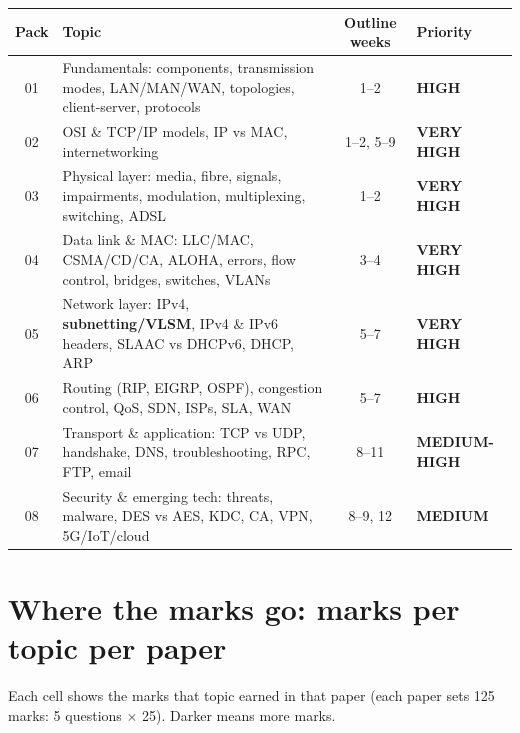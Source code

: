 \documentclass[10pt]{article}
\begin{document}
\begin{center}\small
\begin{tabularx}{\linewidth}{@{}c X c l@{}}
\toprule
\textbf{Pack} & \textbf{Topic} & \textbf{Outline weeks} & \textbf{Priority}\\\midrule
01 & Fundamentals: components, transmission modes, LAN/MAN/WAN, topologies, client-server, protocols & 1--2 & \textcolor{medc}{\textbf{HIGH}}\\
02 & OSI \& TCP/IP models, IP vs MAC, internetworking & 1--2, 5--9 & \textcolor{hardc}{\textbf{VERY HIGH}}\\
03 & Physical layer: media, fibre, signals, impairments, modulation, multiplexing, switching, ADSL & 1--2 & \textcolor{hardc}{\textbf{VERY HIGH}}\\
04 & Data link \& MAC: LLC/MAC, CSMA/CD/CA, ALOHA, errors, flow control, bridges, switches, VLANs & 3--4 & \textcolor{hardc}{\textbf{VERY HIGH}}\\
05 & Network layer: IPv4, \textbf{subnetting/VLSM}, IPv4 \& IPv6 headers, SLAAC vs DHCPv6, DHCP, ARP & 5--7 & \textcolor{hardc}{\textbf{VERY HIGH}}\\
06 & Routing (RIP, EIGRP, OSPF), congestion control, QoS, SDN, ISPs, SLA, WAN & 5--7 & \textcolor{medc}{\textbf{HIGH}}\\
07 & Transport \& application: TCP vs UDP, handshake, DNS, troubleshooting, RPC, FTP, email & 8--11 & \textcolor{easyc!80!ink}{\textbf{MEDIUM-HIGH}}\\
08 & Security \& emerging tech: threats, malware, DES vs AES, KDC, CA, VPN, 5G/IoT/cloud & 8--9, 12 & \textcolor{easyc!80!ink}{\textbf{MEDIUM}}\\
\bottomrule
\end{tabularx}
\end{center}

\section{Where the marks go: marks per topic per paper}

Each cell shows the marks that topic earned in that paper (each paper sets 125 marks: 5 questions $\times$ 25). Darker means more marks.
\end{document}
